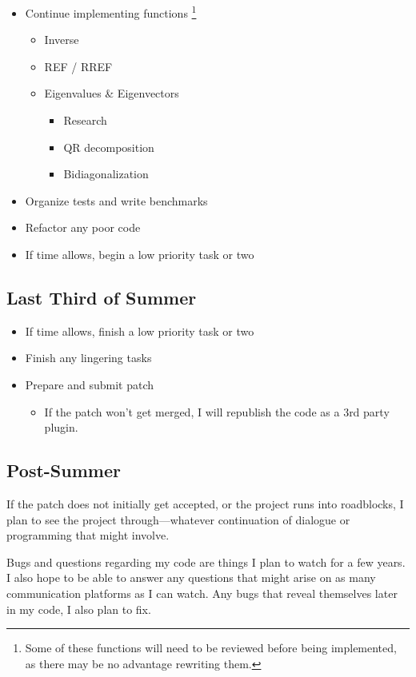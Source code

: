 \documentclass[aps,prl,reprint,groupedaddress,nofootinbib]{revtex4-1}
\begin{document}
\begin{itemize}
\item Continue implementing functions \footnote{Some of these functions will need to be reviewed before being implemented, as there may be no advantage rewriting them.} 
\begin{itemize}
\item Inverse
\item REF / RREF
\item Eigenvalues \& Eigenvectors
\begin{itemize}
\item Research
\item QR decomposition
\item Bidiagonalization
\end{itemize}
\end{itemize}
\item Organize tests and write benchmarks
\item Refactor any poor code
\item If time allows, begin a low priority task or two
\end{itemize}

\subsection{Last Third of Summer}
\label{sec:org74372d0}

\begin{itemize}
\item If time allows, finish a low priority task or two
\item Finish any lingering tasks
\item Prepare and submit patch
\begin{itemize}
\item If the patch won't get merged, I will republish the code as a 3rd party plugin.
\end{itemize}
\end{itemize}

\subsection{Post-Summer}
\label{sec:org8957a06}
If the patch does not initially get accepted,
or the project runs into roadblocks,
I plan to see the project through---whatever continuation of dialogue or programming
that might involve.

Bugs and questions regarding my code are things I plan to watch for a few years.
I also hope to be able to answer any questions that might arise
on as many communication platforms as I can watch.
Any bugs that reveal themselves later in my code, I also plan to fix.
\end{document}
